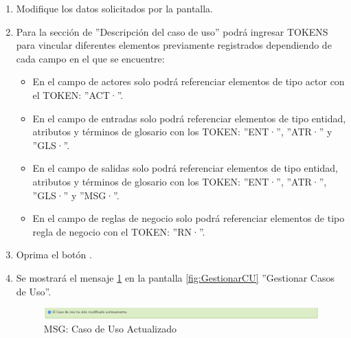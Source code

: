 \begin{enumerate}
			\item Modifique los datos solicitados por la pantalla.
			
			\item Para la sección de ''Descripción del caso de uso'' podrá ingresar TOKENS para vincular diferentes elementos previamente registrados dependiendo de cada campo en el que se encuentre:
			
			\begin{itemize}
				\item En el campo de actores solo podrá referenciar elementos de tipo actor con el TOKEN: ''ACT·''.
				\item En el campo de entradas solo podrá referenciar elementos de tipo entidad, atributos y términos de glosario con los TOKEN: ''ENT·'', ''ATR·'' y ''GLS·''.
				\item En el campo de salidas solo podrá referenciar elementos de tipo entidad, atributos y términos de glosario con los TOKEN: ''ENT·'', ''ATR·'', ''GLS·'' y ''MSG·''.
				\item En el campo de reglas de negocio solo podrá referenciar elementos de tipo regla de negocio con el TOKEN: ''RN·''.
			\end{itemize}
						
			\item Oprima el botón \IUAceptar.
			
			\item Se mostrará el mensaje \ref{fig:CUModificado} en la pantalla \ref{fig:GestionarCU} ''Gestionar Casos de Uso''.
			
			\begin{figure}[htbp!]
				\begin{center}
					\includegraphics[scale=0.56]{roles/lider/casosUso/pantallas/IU12-2MSG1}
					\caption{MSG: Caso de Uso Actualizado}
					\label{fig:CUModificado}
				\end{center}
			\end{figure}
			\end{enumerate}